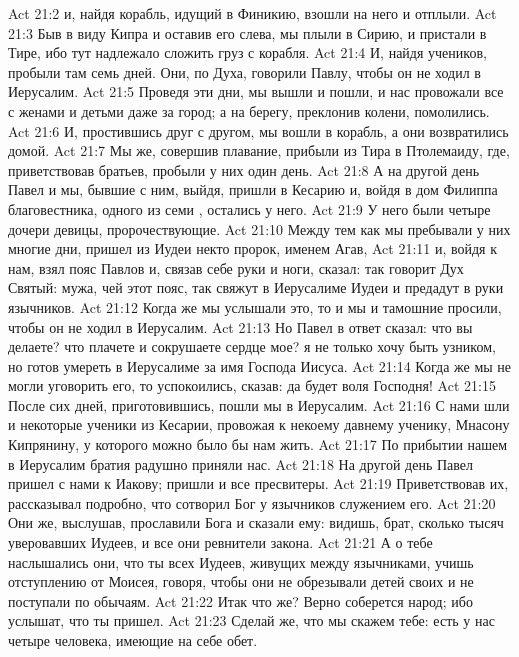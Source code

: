 \vs Act 21:2 и, найдя корабль, идущий в Финикию, взошли на него и отплыли.
\vs Act 21:3 Быв в виду Кипра и оставив его слева, мы плыли в Сирию, и пристали в Тире, ибо тут надлежало сложить груз с корабля.
\vs Act 21:4 И, найдя учеников, пробыли там семь дней. Они, по  Духа, говорили Павлу, чтобы он не ходил в Иерусалим.
\vs Act 21:5 Проведя эти дни, мы вышли и пошли, и нас провожали все с женами и детьми даже за город; а на берегу, преклонив колени, помолились.
\vs Act 21:6 И, простившись друг с другом, мы вошли в корабль, а они возвратились домой.
\rsbpar\vs Act 21:7 Мы же, совершив плавание, прибыли из Тира в Птолемаиду, где, приветствовав братьев, пробыли у них один день.
\vs Act 21:8 А на другой день Павел и мы, бывшие с ним, выйдя, пришли в Кесарию и, войдя в дом Филиппа благовестника, одного из семи , остались у него.
\vs Act 21:9 У него были четыре дочери девицы, пророчествующие.
\vs Act 21:10 Между тем как мы пребывали у них многие дни, пришел из Иудеи некто пророк, именем Агав,
\vs Act 21:11 и, войдя к нам, взял пояс Павлов и, связав себе руки и ноги, сказал: так говорит Дух Святый: мужа, чей этот пояс, так свяжут в Иерусалиме Иудеи и предадут в руки язычников.
\vs Act 21:12 Когда же мы услышали это, то и мы и тамошние просили, чтобы он не ходил в Иерусалим.
\vs Act 21:13 Но Павел в ответ сказал: что вы делаете? что плачете и сокрушаете сердце мое? я не только хочу быть узником, но готов умереть в Иерусалиме за имя Господа Иисуса.
\vs Act 21:14 Когда же мы не могли уговорить его, то успокоились, сказав: да будет воля Господня!
\rsbpar\vs Act 21:15 После сих дней, приготовившись, пошли мы в Иерусалим.
\vs Act 21:16 С нами шли и некоторые ученики из Кесарии, провожая  к некоему давнему ученику, Мнасону Кипрянину, у которого можно было бы нам жить.
\rsbpar\vs Act 21:17 По прибытии нашем в Иерусалим братия радушно приняли нас.
\vs Act 21:18 На другой день Павел пришел с нами к Иакову; пришли и все пресвитеры.
\vs Act 21:19 Приветствовав их,  рассказывал подробно, что сотворил Бог у язычников служением его.
\vs Act 21:20 Они же, выслушав, прославили Бога и сказали ему: видишь, брат, сколько тысяч уверовавших Иудеев, и все они ревнители закона.
\vs Act 21:21 А о тебе наслышались они, что ты всех Иудеев, живущих между язычниками, учишь отступлению от Моисея, говоря, чтобы они не обрезывали детей своих и не поступали по обычаям.
\vs Act 21:22 Итак что же? Верно соберется народ; ибо услышат, что ты пришел.
\vs Act 21:23 Сделай же, что мы скажем тебе: есть у нас четыре человека, имеющие на себе обет.
